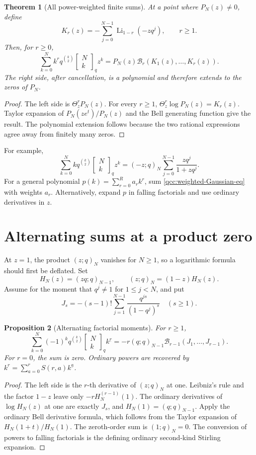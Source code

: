 \documentclass[11pt,a4paper,oneside,openany]{book}
\newtheorem{theorem}{Theorem}[chapter]
\newtheorem{proposition}[theorem]{Proposition}
\theoremstyle{definition}
\theoremstyle{remark}
\newcommand{\GB}[3][q]{\begin{bmatrix}#2\\#3\end{bmatrix}_{#1}}
\newcommand{\Y}[1]{\mathcal B_{#1}}
\newcommand{\fall}[2]{#1^{\underline{#2}}}
\DeclareMathOperator{\Li}{Li}
\begin{document}
\begin{theorem}[All power-weighted finite sums]\label{qcc:weighted-Gaussian}
At a point where \(P_N(z)\ne0\), define
\[
 K_r(z)=-\sum_{j=0}^{N-1}\Li_{1-r}(-zq^j),\qquad r\ge1.
\]
Then, for \(r\ge0\),
\begin{equation}\label{qcc:weighted-Gaussian-eq}
 \sum_{k=0}^{N}k^r q^{\binom k2}\GB Nk z^k
   =P_N(z)\Y r(K_1(z),\ldots,K_r(z)).
\end{equation}
The right side, after cancellation, is a polynomial and therefore extends to
the zeros of \(P_N\).
\end{theorem}
\begin{proof}
The left side is \(\Theta_z^rP_N(z)\). For every \(r\ge1\),
\(\Theta_z^r\log P_N(z)=K_r(z)\). Taylor expansion of
\(P_N(ze^t)/P_N(z)\) and the Bell generating function give the result.
The polynomial extension follows because the two rational expressions agree
away from finitely many zeros.
\end{proof}
For example,
\[
 \sum_{k=0}^{N}kq^{\binom k2}\GB Nk z^k
  =(-z;q)_N\sum_{j=0}^{N-1}\frac{zq^j}{1+zq^j}.
\]
For a general polynomial \(p(k)=\sum_{r=0}^{R}a_rk^r\), sum
\eqref{qcc:weighted-Gaussian-eq} with weights \(a_r\). Alternatively,
expand \(p\) in falling factorials and use ordinary derivatives in \(z\).

\section{Alternating sums at a product zero}
At \(z=1\), the product \((z;q)_N\) vanishes for \(N\ge1\), so a
logarithmic formula should first be deflated. Set
\[
 H_N(z)=(zq;q)_{N-1},\qquad (z;q)_N=(1-z)H_N(z).
\]
Assume for the moment that \(q^j\ne1\) for \(1\le j<N\), and put
\begin{equation}\label{qcc:alternating-kernels}
 J_s=-(s-1)!\sum_{j=1}^{N-1}
             \frac{q^{js}}{(1-q^j)^s}\quad(s\ge1).
\end{equation}

\begin{proposition}[Alternating factorial moments]\label{qcc:alternating}
For \(r\ge1\),
\begin{equation}\label{qcc:alternating-eq}
 \sum_{k=0}^{N}(-1)^kq^{\binom k2}\GB Nk\fall{k}{r}
   =-r(q;q)_{N-1}\Y{r-1}(J_1,\ldots,J_{r-1}).
\end{equation}
For \(r=0\), the sum is zero. Ordinary powers are recovered by
\(k^r=\sum_{a=0}^{r}S(r,a)\fall{k}{a}\).
\end{proposition}
\begin{proof}
The left side is the \(r\)-th derivative of \((z;q)_N\) at one.
Leibniz's rule and the factor \(1-z\) leave only
\(-rH_N^{(r-1)}(1)\). The ordinary derivatives of
\(\log H_N(z)\) at one are exactly \(J_s\), and
\(H_N(1)=(q;q)_{N-1}\). Apply the ordinary Bell derivative formula,
which follows from the Taylor expansion of \(H_N(1+t)/H_N(1)\).
The zeroth-order sum is \((1;q)_N=0\). The conversion of powers to
falling factorials is the defining ordinary second-kind Stirling expansion.
\end{proof}
\end{document}
